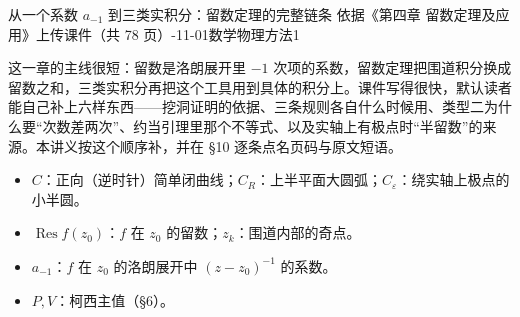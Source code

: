 \documentclass[11pt]{ctexart}
\let\origsubhdr\subhdr
\renewcommand{\subhdr}[1]{\par\needspace{4\baselineskip}\origsubhdr{#1}}
\let\orighdr\hdr
\renewcommand{\hdr}[2]{\par\orighdr{#1}{#2}}
\begin{document}
{从一个系数 $a_{-1}$ 到三类实积分：留数定理的完整链条}
{依据《第四章 留数定理及应用》上传课件（共 78 页）-11-01\quad 数学物理方法1}


这一章的主线很短：留数是洛朗展开里 $-1$ 次项的系数，留数定理把围道积分换成留数之和，三类实积分再把这个工具用到具体的积分上。课件写得很快，默认读者能自己补上六样东西——挖洞证明的依据、三条规则各自什么时候用、类型二为什么要“次数差两次”、约当引理里那个不等式、以及实轴上有极点时“半留数”的来源。本讲义按这个顺序补，并在 §10 逐条点名页码与原文短语。



\begin{itemize}
\item $C$：正向（逆时针）简单闭曲线；$C_R$：上半平面大圆弧；$C_\varepsilon$：绕实轴上极点的小半圆。
\item $\operatorname{Res}f(z_0)$：$f$ 在 $z_0$ 的留数；$z_k$：围道内部的奇点。
\item $a_{-1}$：$f$ 在 $z_0$ 的洛朗展开中 $(z-z_0)^{-1}$ 的系数。
\item $P,V$：柯西主值（§6）。
\end{itemize}

\end{document}
